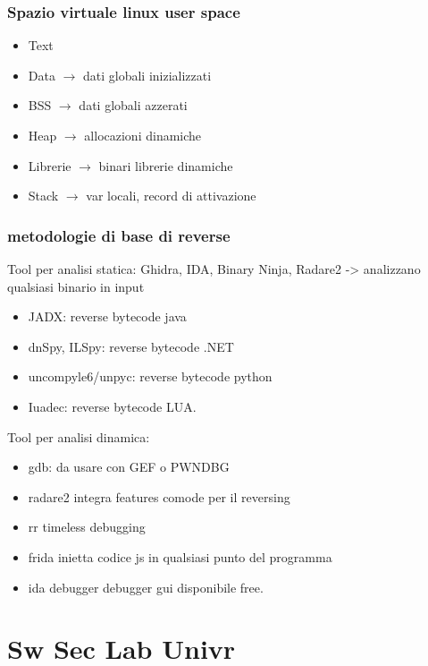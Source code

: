 \documentclass[oneside,a4paper,11pt]{book}
\theoremstyle{italicstyle}
\theoremstyle{normStyle}
\begin{document}
\subsection{Spazio virtuale linux user space}

 \begin{itemize}
  \item Text
  \item Data $\rightarrow$ dati globali inizializzati
\item BSS $\rightarrow$ dati globali azzerati
\item Heap $\rightarrow$ allocazioni dinamiche
\item Librerie $\rightarrow$ binari librerie dinamiche
\item Stack $\rightarrow$ var locali, record di attivazione
\end{itemize}

\subsection{metodologie di base di reverse}
Tool per analisi statica: Ghidra, IDA, Binary Ninja, Radare2 -> analizzano qualsiasi binario in input\\
\begin{itemize}
\item JADX: reverse bytecode java
\item dnSpy, ILSpy: reverse bytecode .NET
\item uncompyle6/unpyc: reverse bytecode python
\item Iuadec: reverse bytecode LUA.
\end{itemize}
Tool per analisi dinamica:
\begin{itemize}
\item gdb: da usare con GEF o PWNDBG
\item radare2 integra features comode per il reversing
\item rr timeless debugging
\item frida inietta codice js in qualsiasi punto del programma
\item ida debugger debugger gui disponibile free.
\end{itemize}

\chapter{Sw Sec Lab Univr}
\end{document}
